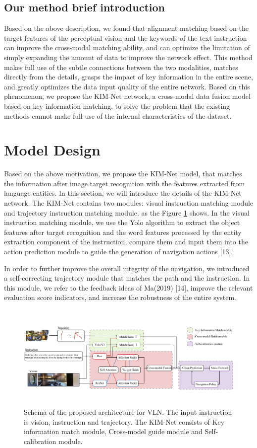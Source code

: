\subsection{Our method brief introduction}	

Based on the above description, we found that alignment matching based on the target features of the perceptual vision and the keywords of the text instruction can improve the cross-modal matching ability, and can optimize the limitation of simply expanding the amount of data to improve the network effect. This method makes full use of the subtle connections between the two modalities, matches directly from the details, grasps the impact of key information in the entire scene, and greatly optimizes the data input quality of the entire network. Based on this phenomenon, we propose the KIM-Net network, a cross-modal data fusion model based on key information matching, to solve the problem that the existing methods cannot make full use of the internal characteristics of the dataset.

\section{Model Design}
	
Based on the above motivation, we propose the KIM-Net model, that matches the information after image target recognition with the features extracted from language entities. In this section, we will introduce the details of the KIM-Net network. The KIM-Net contains two modules: visual instruction matching module and trajectory instruction matching module. as the Figure \ref{image03} shows. In the visual instruction matching module, we use the Yolo algorithm to extract the object features after target recognition and the word features processed by the entity extraction component of the instruction, compare them and input them into the action prediction module to guide the generation of navigation actions [13].

In order to further improve the overall integrity of the navigation, we introduced a self-correcting trajectory module that matches the path and the instruction. In this module, we refer to the feedback ideas of Ma(2019) [14], improve the relevant evaluation score indicators, and increase the robustness of the entire system.
\begin{figure}
		\centering
		\includegraphics[scale=1]{image03.png}
		\caption{Schema of the proposed architecture for VLN. The input instruction is vision, instruction and trajectory. The KIM-Net consists of Key information match module, Cross-model guide module and Self-calibration module.}
		\label{image03}
\end{figure}
